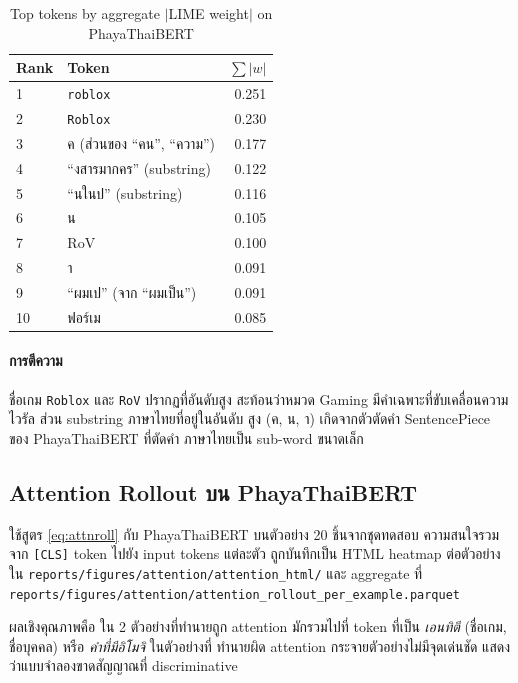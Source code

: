 \begin{table}[H]
\centering
\caption{Top tokens by aggregate $|$LIME weight$|$ on PhayaThaiBERT}
\label{tab:lime-top}
\begin{tabularx}{\textwidth}{lXr}
\toprule
\textbf{Rank} & \textbf{Token} & \textbf{$\sum|w|$} \\
\midrule
1 & \texttt{roblox}                     & 0.251 \\
2 & \texttt{Roblox}                     & 0.230 \\
3 & ค (ส่วนของ ``คน'', ``ความ'')        & 0.177 \\
4 & ``งสารมากคร'' (substring)            & 0.122 \\
5 & ``นในป'' (substring)                & 0.116 \\
6 & น                                    & 0.105 \\
7 & RoV                                  & 0.100 \\
8 & า                                    & 0.091 \\
9 & ``ผมเป'' (จาก ``ผมเป็น'')           & 0.091 \\
10 & ฟอร์เม                              & 0.085 \\
\bottomrule
\end{tabularx}
\end{table}

\paragraph{การตีความ}
ชื่อเกม \texttt{Roblox} และ \texttt{RoV} ปรากฏที่อันดับสูง สะท้อนว่าหมวด
Gaming มีคำเฉพาะที่ขับเคลื่อนความไวรัล ส่วน substring ภาษาไทยที่อยู่ในอันดับ
สูง (ค, น, า) เกิดจากตัวตัดคำ SentencePiece ของ PhayaThaiBERT ที่ตัดคำ
ภาษาไทยเป็น sub-word ขนาดเล็ก

\subsection{Attention Rollout บน PhayaThaiBERT}

ใช้สูตร \eqref{eq:attnroll} กับ PhayaThaiBERT บนตัวอย่าง 20 ชิ้นจากชุดทดสอบ
ความสนใจรวมจาก \texttt{[CLS]} token ไปยัง input tokens แต่ละตัว ถูกบันทึกเป็น
HTML heatmap ต่อตัวอย่างใน \texttt{reports/figures/attention/attention\_html/}
และ aggregate ที่ \texttt{reports/figures/attention/attention\_rollout\_per\_example.parquet}

ผลเชิงคุณภาพคือ ใน 2 ตัวอย่างที่ทำนายถูก attention มักรวมไปที่ token ที่เป็น
\emph{เอนทิตี} (ชื่อเกม, ชื่อบุคคล) หรือ \emph{คำที่มีอิโมจิ} ในตัวอย่างที่
ทำนายผิด attention กระจายตัวอย่างไม่มีจุดเด่นชัด แสดงว่าแบบจำลองขาดสัญญาณที่
discriminative

